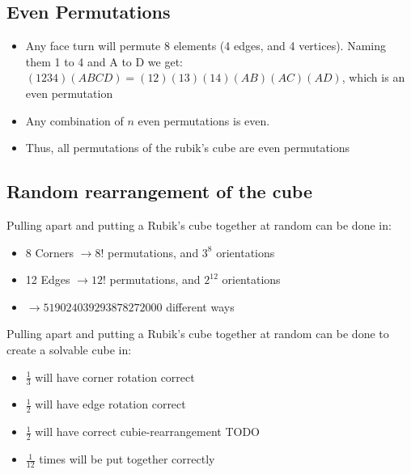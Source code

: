 \documentclass[xcolor=pdftex,dvipsnames,table]{beamer}
\begin{document}
\subsection{Even Permutations}
\begin{frame}
  \begin{itemize}
    \item Any face turn will permute 8 elements (4 edges, and 4 vertices). Naming them 1 to 4 and A to D we get: $(1234)(ABCD) = (12)(13)(14)(AB)(AC)(AD)$, which is an even permutation
    \item Any combination of $n$ even permutations is even.
    \item Thus, all permutations of the rubik's cube are even permutations
  \end{itemize}
\end{frame}

\subsection{Random rearrangement of the cube}
\begin{frame}
  Pulling apart and putting a Rubik's cube together at random can be done in:
  \begin{itemize}
    \item 8 Corners $\rightarrow 8!$ permutations, and $3^8$ orientations
    \item 12 Edges $\rightarrow 12!$ permutations, and $2^{12}$ orientations
    \item $\rightarrow 519024039293878272000$ different ways
    \end{itemize}
\end{frame}

\begin{frame}
  Pulling apart and putting a Rubik's cube together at random can be done to create a solvable cube in:
  \begin{itemize}
    \item $\frac{1}{3}$ will have corner rotation correct
    \item $\frac{1}{2}$ will have edge rotation correct
    \item $\frac{1}{2}$ will have correct cubie-rearrangement TODO
    \item $\frac{1}{12}$ times will be put together correctly
    \end{itemize}
\end{frame}
\end{document}
